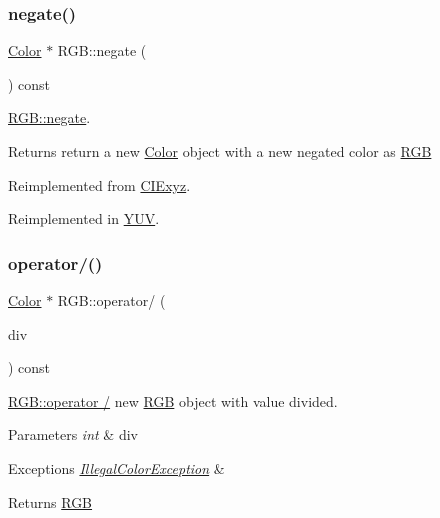 \subsubsection{\texorpdfstring{negate()}{negate()}}
{\footnotesize\ttfamily \hyperlink{class_color}{Color} $\ast$ R\+G\+B\+::negate (\begin{DoxyParamCaption}{ }\end{DoxyParamCaption}) const\hspace{0.3cm}{\ttfamily [virtual]}}



\hyperlink{class_r_g_b_a7aad38ac17ec3201c65f8f5e90637b69}{R\+G\+B\+::negate}. 

\begin{DoxyReturn}{Returns}
return a new \hyperlink{class_color}{Color} object with a new negated color as \hyperlink{class_r_g_b}{R\+GB} 
\end{DoxyReturn}


Reimplemented from \hyperlink{class_c_i_exyz_a4a454df6cbb71f3fcfd2d1ea9d500d94}{C\+I\+Exyz}.



Reimplemented in \hyperlink{class_y_u_v_a079872ae88552066ce1abb39cc0a40de}{Y\+UV}.

\mbox{\label{class_r_g_b_a9d250e0f58e7ae7d4c69ced724da6f80}} 
\subsubsection{\texorpdfstring{operator/()}{operator/()}}
{\footnotesize\ttfamily \hyperlink{class_color}{Color} $\ast$ R\+G\+B\+::operator/ (\begin{DoxyParamCaption}\item[{const int \&}]{div }\end{DoxyParamCaption}) const\hspace{0.3cm}{\ttfamily [virtual]}}



\hyperlink{class_r_g_b_a9d250e0f58e7ae7d4c69ced724da6f80}{R\+G\+B\+::operator /} new \hyperlink{class_r_g_b}{R\+GB} object with value divided. 


\begin{DoxyParams}{Parameters}
{\em int} & div \\
\hline
\end{DoxyParams}

\begin{DoxyExceptions}{Exceptions}
{\em \hyperlink{class_illegal_color_exception}{Illegal\+Color\+Exception}} & \\
\hline
\end{DoxyExceptions}
\begin{DoxyReturn}{Returns}
\hyperlink{class_r_g_b}{R\+GB} 
\end{DoxyReturn}


